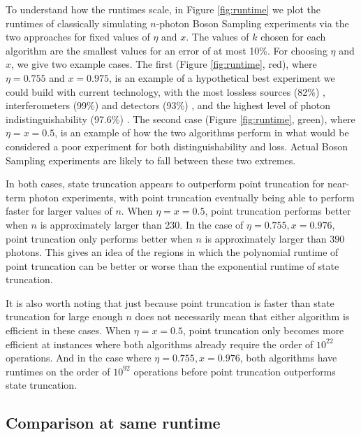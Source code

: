 To understand how the runtimes scale, in Figure \ref{fig:runtime} we plot the runtimes of classically simulating $n$-photon Boson Sampling experiments via the two approaches for fixed values of $\eta$ and $x$. 
The values of $k$ chosen for each algorithm are the smallest values for an error of at most 10\%. 
For choosing $\eta$ and $x$, we give two example cases. 
The first (Figure \ref{fig:runtime}, red), where $\eta=0.755$ and $x=0.975$, is an example of a hypothetical best experiment we could build with current technology, with the most lossless sources (82\%) \cite{slussarenko2017}, interferometers (99\%) \cite{wang2018} and detectors (93\%) \cite{marsili2013}, and the highest level of photon indistinguishability (97.6\%) \cite{he2018}. 
The second case (Figure \ref{fig:runtime}, green), where $\eta=x=0.5$, is an example of how the two algorithms perform in what would be considered a poor experiment for both distinguishability and loss. 
Actual Boson Sampling experiments are likely to fall between these two extremes.

In both cases, state truncation appears to outperform point truncation for near-term photon experiments, with point truncation eventually being able to perform faster for larger values of $n$. 
When $\eta=x=0.5$, point truncation performs better when $n$ is approximately larger than 230. 
In the case of $\eta=0.755, x=0.976$, point truncation only performs better when $n$ is approximately larger than $390$ photons. 
This gives an idea of the regions in which the polynomial runtime of point truncation can be better or worse than the exponential runtime of state truncation.

It is also worth noting that just because point truncation is faster than state truncation for large enough $n$ does not necessarily mean that either algorithm is efficient in these cases. 
When $\eta=x=0.5$, point truncation only becomes more efficient at instances where both algorithms already require the order of $10^{22}$ operations. 
And in the case where $\eta=0.755, x=0.976$, both algorithms have runtimes on the order of $10^{92}$ operations before point truncation outperforms state truncation.


\subsection{Comparison at same runtime}
\label{subsec:same-runtime}

